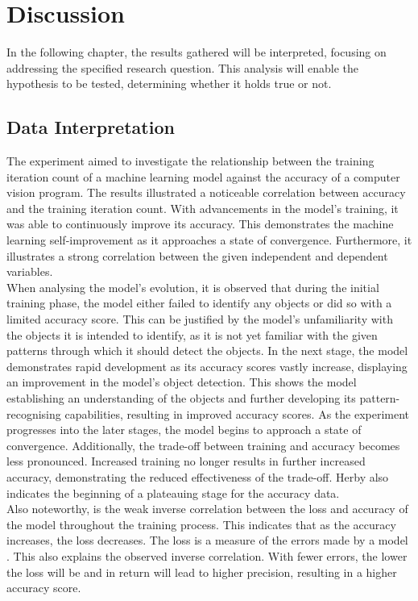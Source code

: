 \section{Discussion}
In the following chapter, the results gathered will be interpreted, focusing on addressing the specified research question. This analysis will enable the hypothesis to be tested, determining whether it holds true or not.\\


\subsection{Data Interpretation}

The experiment aimed to investigate the relationship between the training iteration count of a machine learning model against the accuracy of a computer vision program. The results illustrated a noticeable correlation between accuracy and the training iteration count. With advancements in the model's training, it was able to continuously improve its accuracy. This demonstrates the machine learning self-improvement as it approaches a state of convergence. Furthermore, it illustrates a strong correlation between the given independent and dependent variables.  \\

When analysing the model's evolution, it is observed that during the initial training phase, the model either failed to identify any objects or did so with a limited accuracy score. This can be justified by the model's unfamiliarity with the objects it is intended to identify, as it is not yet familiar with the given patterns through which it should detect the objects. In the next stage, the model demonstrates rapid development as its accuracy scores vastly increase, displaying an improvement in the model's object detection. This shows the model establishing an understanding of the objects and further developing its pattern-recognising capabilities, resulting in improved accuracy scores. As the experiment progresses into the later stages, the model begins to approach a state of convergence. Additionally, the trade-off between training and accuracy becomes less pronounced. Increased training no longer results in further increased accuracy, demonstrating the reduced effectiveness of the trade-off. Herby also indicates the beginning of a plateauing stage for the accuracy data.   \\ 

Also noteworthy, is the weak inverse correlation between the loss and accuracy of the model throughout the training process. This indicates that as the accuracy increases, the loss decreases. The loss is a measure of the errors made by a model \parencite{Baeldung2022}. This also explains the observed inverse correlation. With fewer errors, the lower the loss will be and in return will lead to higher precision, resulting in a higher accuracy score.  \\

